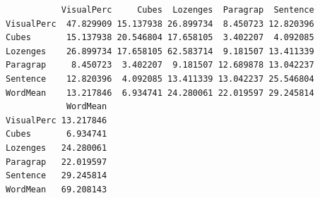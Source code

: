 \begin{Shaded}
\begin{Highlighting}[]
\end{Highlighting}
\end{Shaded}

\begin{verbatim}
           VisualPerc     Cubes  Lozenges  Paragrap  Sentence
VisualPerc  47.829909 15.137938 26.899734  8.450723 12.820396
Cubes       15.137938 20.546804 17.658105  3.402207  4.092085
Lozenges    26.899734 17.658105 62.583714  9.181507 13.411339
Paragrap     8.450723  3.402207  9.181507 12.689878 13.042237
Sentence    12.820396  4.092085 13.411339 13.042237 25.546804
WordMean    13.217846  6.934741 24.280061 22.019597 29.245814
            WordMean
VisualPerc 13.217846
Cubes       6.934741
Lozenges   24.280061
Paragrap   22.019597
Sentence   29.245814
WordMean   69.208143
\end{verbatim}

\begin{Shaded}
\begin{Highlighting}[]


\NormalTok{(}
\NormalTok{  , } 
\NormalTok{  , } 
\NormalTok{  , } 
\NormalTok{  , } 
\NormalTok{  , } 
\NormalTok{  , } 
\NormalTok{  , } 
\NormalTok{  , } 
\NormalTok{  , } 
\NormalTok{  , }
\NormalTok{)}
\end{Highlighting}
\end{Shaded}

